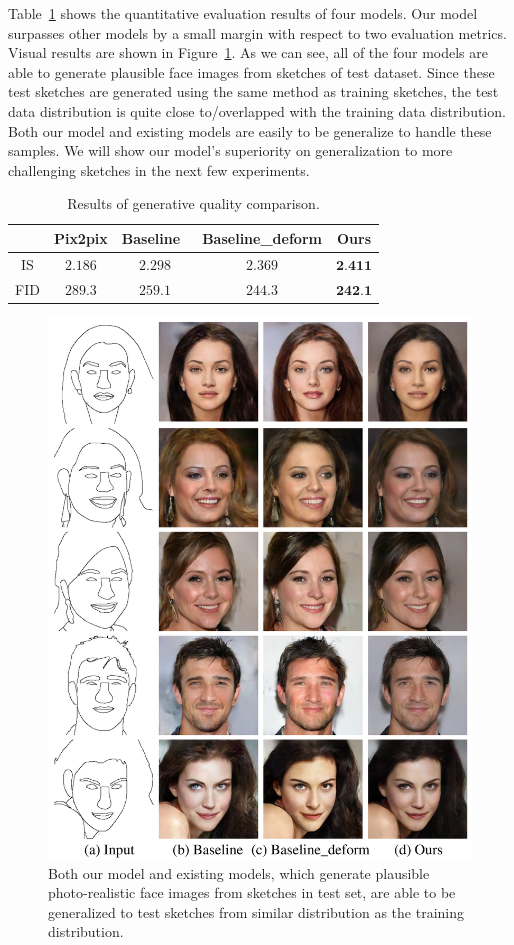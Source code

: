 Table~\ref{tab:generative_quality} shows the quantitative evaluation results of four models. Our model surpasses other models by a small margin with respect to two evaluation metrics. 
Visual results are shown in Figure~\ref{fig:generative_quality}. As we can see, all of the four models are able to generate plausible face images from sketches of test dataset. Since these test sketches are generated using the same method as training sketches, the test data distribution is quite close to/overlapped with the training data distribution. Both our model and existing models are easily to be generalize to handle these samples. We will show our model's superiority on generalization to more challenging sketches in the next few experiments.



\begin{table}[h]
	\centering	
	\caption{Results of generative quality comparison.}
	\begin{tabular}{|c|c|c|c|c|}\hline
		& Pix2pix \cite{pix2pix} & Baseline~\cite{pix2pixHD} & Baseline\_deform & Ours \\\hline
		IS & $2.186$ & $2.298$ & $2.369$ & $\textbf{2.411}$\\\hline
		FID & $289.3$ & $259.1$ & $244.3$ & $\textbf{242.1}$\\\hline
	\end{tabular}
	\label{tab:generative_quality}
\end{table} 

\begin{figure}
	\includegraphics[width=0.9\linewidth]{figs/results}
	\caption{Both our model and existing models, which generate plausible photo-realistic face images from sketches in test set, are able to be generalized to test sketches from similar distribution as the training distribution. }
	\label{fig:generative_quality}
\end{figure}

